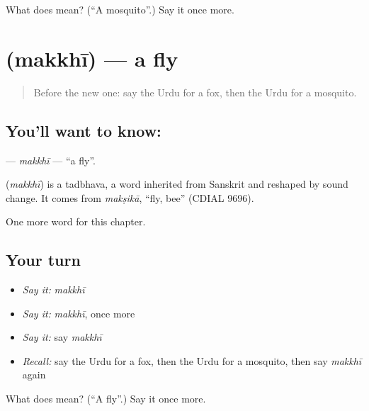 \begin{tcolorbox}[breakable,colback=teal!4,colframe=teal!35!black,title={Before you move on}]
What does  mean? (\textquotedblleft{}A mosquito\textquotedblright{}.) Say it once more.
\end{tcolorbox}
\section[\texorpdfstring{\ur{مکھی} (makkhī)}{مکھی (makkhī)}]{ (makkhī) — a fly}

\label{lesson:UR-C127-makkhi}



\begin{quote}
Before the new one: say the Urdu for a fox, then the Urdu for a mosquito.
\end{quote}

\subsection*{You'll want to know: }
\textbf{} — \emph{makkhī} — \textquotedblleft{}a fly\textquotedblright{}.

\begin{cousinweb}
\textbf{} (\emph{makkhī}) is a tadbhava, a word inherited from Sanskrit and reshaped by sound change. It comes from \emph{makṣikā}, \textquotedblleft{}fly, bee\textquotedblright{} (CDIAL 9696).
\end{cousinweb}

\begin{grammarlens}[title={What you've built}]
One more word for this chapter.
\end{grammarlens}

\subsection*{Your turn}
\begin{itemize}
\raggedright
  \item \emph{Say it:} \emph{makkhī}
  \item \emph{Say it:} \emph{makkhī}, once more
  \item \emph{Say it:} say \emph{makkhī}
  \item \emph{Recall:} say the Urdu for a fox, then the Urdu for a mosquito, then say \emph{makkhī} again
\end{itemize}

\begin{tcolorbox}[breakable,colback=teal!4,colframe=teal!35!black,title={Before you move on}]
What does  mean? (\textquotedblleft{}A fly\textquotedblright{}.) Say it once more.
\end{tcolorbox}

